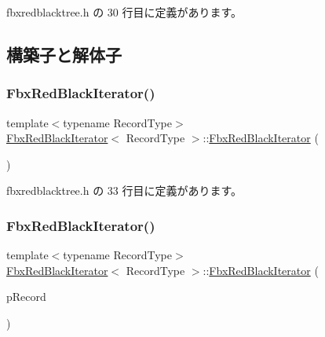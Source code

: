  fbxredblacktree.\+h の 30 行目に定義があります。



\subsection{構築子と解体子}
\mbox{\label{class_fbx_red_black_iterator_ad65b0d26a7a2baff0214104479303833}} 
\subsubsection{\texorpdfstring{Fbx\+Red\+Black\+Iterator()}{FbxRedBlackIterator()}\hspace{0.1cm}{\footnotesize\ttfamily [1/3]}}
{\footnotesize\ttfamily template$<$typename Record\+Type$>$ \\
\hyperlink{class_fbx_red_black_iterator}{Fbx\+Red\+Black\+Iterator}$<$ Record\+Type $>$\+::\hyperlink{class_fbx_red_black_iterator}{Fbx\+Red\+Black\+Iterator} (\begin{DoxyParamCaption}{ }\end{DoxyParamCaption})\hspace{0.3cm}{\ttfamily [inline]}}



 fbxredblacktree.\+h の 33 行目に定義があります。

\mbox{\label{class_fbx_red_black_iterator_a596005a983b700722325897b905de913}} 
\subsubsection{\texorpdfstring{Fbx\+Red\+Black\+Iterator()}{FbxRedBlackIterator()}\hspace{0.1cm}{\footnotesize\ttfamily [2/3]}}
{\footnotesize\ttfamily template$<$typename Record\+Type$>$ \\
\hyperlink{class_fbx_red_black_iterator}{Fbx\+Red\+Black\+Iterator}$<$ Record\+Type $>$\+::\hyperlink{class_fbx_red_black_iterator}{Fbx\+Red\+Black\+Iterator} (\begin{DoxyParamCaption}\item[{Record\+Type $\ast$}]{p\+Record }\end{DoxyParamCaption})\hspace{0.3cm}{\ttfamily [inline]}}



